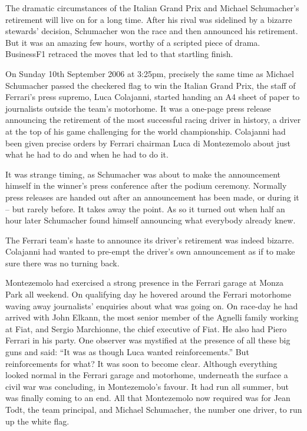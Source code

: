 \documentclass{article}
\begin{document}
The dramatic circumstances of the Italian Grand Prix and Michael Schumacher’s retirement will live on for a long time. After his rival was sidelined by a bizarre stewards’ decision, Schumacher won the race and then announced his retirement. But it was an amazing few hours, worthy of a scripted piece of drama. BusinessF1 retraced the moves that led to that startling finish.

On Sunday 10th September 2006 at 3:25pm, precisely the same time as Michael Schumacher passed the checkered flag to win the Italian Grand Prix, the staff of Ferrari’s press supremo, Luca Colajanni, started handing an A4 sheet of paper to journalists outside the team’s motorhome. It was a one-page press release announcing the retirement of the most successful racing driver in history, a driver at the top of his game challenging for the world championship. Colajanni had been given precise orders by Ferrari chairman Luca di Montezemolo about just what he had to do and when he had to do it.

It was strange timing, as Schumacher was about to make the announcement himself in the winner’s press conference after the podium ceremony. Normally press releases are handed out after an announcement has been made, or during it – but rarely before. It takes away the point. As so it turned out when half an hour later Schumacher found himself announcing what everybody already knew.

The Ferrari team’s haste to announce its driver’s retirement was indeed bizarre. Colajanni had wanted to pre-empt the driver’s own announcement as if to make sure there was no turning back.

Montezemolo had exercised a strong presence in the Ferrari garage at Monza Park all weekend. On qualifying day he hovered around the Ferrari motorhome waving away journalists’ enquiries about what was going on. On race-day he had arrived with John Elkann, the most senior member of the Agnelli family working at Fiat, and Sergio Marchionne, the chief executive of Fiat. He also had Piero Ferrari in his party. One observer was mystified at the presence of all these big guns and said: “It was as though Luca wanted reinforcements.” But reinforcements for what? It was soon to become clear. Although everything looked normal in the Ferrari garage and motorhome, underneath the surface a civil war was concluding, in Montezemolo’s favour. It had run all summer, but was finally coming to an end. All that Montezemolo now required was for Jean Todt, the team principal, and Michael Schumacher, the number one driver, to run up the white flag.
\end{document}
